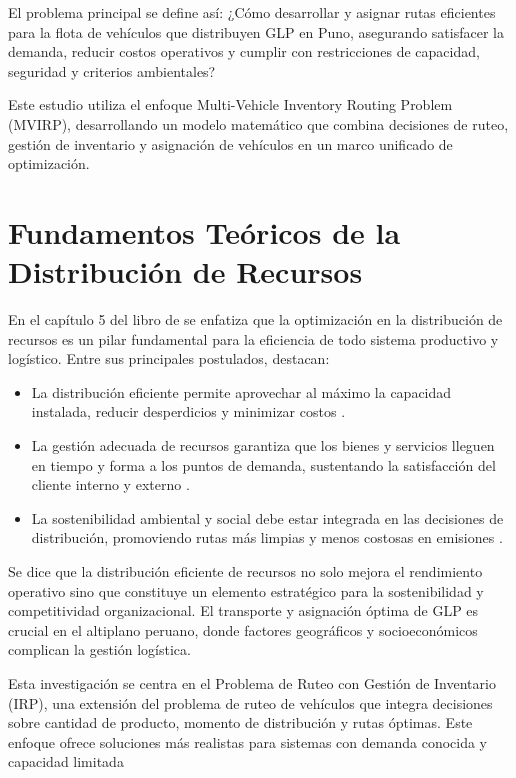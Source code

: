 \documentclass[11pt, a4paper]{article}
\begin{document}
El problema principal se define así:
¿Cómo desarrollar y asignar rutas eficientes para la flota de vehículos que distribuyen GLP en Puno, asegurando satisfacer la demanda, reducir costos operativos y cumplir con restricciones de capacidad, seguridad y criterios ambientales?

Este estudio utiliza el enfoque Multi-Vehicle Inventory Routing Problem (MVIRP), desarrollando un modelo matemático que combina decisiones de ruteo, gestión de inventario y asignación de vehículos en un marco unificado de optimización.

\section{Fundamentos Teóricos de la Distribución de Recursos}

En el capítulo 5 del libro de \citet{Nahmias2014} se enfatiza que la optimización en la distribución de recursos es un pilar fundamental para la eficiencia de todo sistema productivo y logístico. Entre sus principales postulados, destacan:

\begin{itemize}[leftmargin=*]
    \item La distribución eficiente permite aprovechar al máximo la capacidad instalada, reducir desperdicios y minimizar costos \citep{Chopra2018}.
    \item La gestión adecuada de recursos garantiza que los bienes y servicios lleguen en tiempo y forma a los puntos de demanda, sustentando la satisfacción del cliente interno y externo \citep{Ballou2004}.
    \item La sostenibilidad ambiental y social debe estar integrada en las decisiones de distribución, promoviendo rutas más limpias y menos costosas en emisiones \citep{Dekker2012}.

\end{itemize}

Se dice que la distribución eficiente de recursos no solo mejora el rendimiento operativo sino que constituye un elemento estratégico para la sostenibilidad y competitividad organizacional. El transporte y asignación óptima de GLP es crucial en el altiplano peruano, donde factores geográficos y socioeconómicos complican la gestión logística.

Esta investigación se centra en el Problema de Ruteo con Gestión de Inventario (IRP), una extensión del problema de ruteo de vehículos que integra decisiones sobre cantidad de producto, momento de distribución y rutas óptimas. Este enfoque ofrece soluciones más realistas para sistemas con demanda conocida y capacidad limitada \citep{Chopra & Meindl, 2018}
\end{document}
